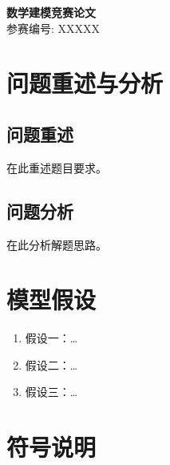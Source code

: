 \documentclass[12pt,a4paper]{article}
\begin{document}
\begin{center}
    \LARGE\textbf{数学建模竞赛论文}\\
    \vspace{0.5cm}
    \large 参赛编号: XXXXX\\
    \vspace{0.5cm}
\end{center}

\begin{abstract}
\noindent 在此填写摘要内容。摘要应包含：问题概述、方法概述、主要结果。

\noindent\textbf{关键词}：关键词1；关键词2；关键词3
\end{abstract}

\thispagestyle{empty}
\newpage

\tableofcontents
\newpage

\section{问题重述与分析}
\label{sec:intro}

\subsection{问题重述}
\label{sec:restate}

在此重述题目要求\cite{ref1}。

\subsection{问题分析}
\label{sec:analysis}

在此分析解题思路。

\section{模型假设}
\label{sec:assumptions}

\begin{enumerate}
    \item 假设一：\ldots
    \item 假设二：\ldots
    \item 假设三：\ldots
\end{enumerate}

\section{符号说明}
\label{sec:notation}
\end{document}
